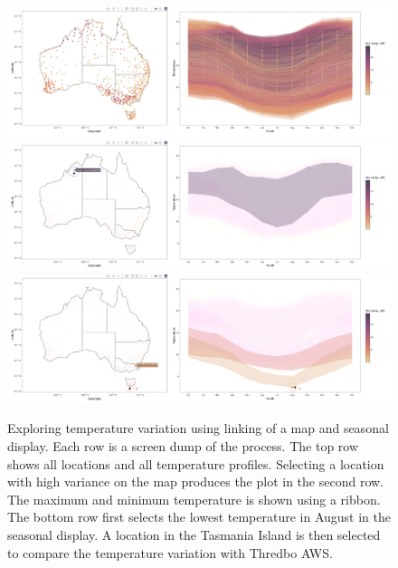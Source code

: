 \documentclass[
]{jss}
\begin{document}
\begin{CodeChunk}
\begin{figure}

{\centering \includegraphics[width=1\linewidth,height=0.23\textheight]{../figures/linking} \includegraphics[width=1\linewidth,height=0.23\textheight]{../figures/linking-north} \includegraphics[width=1\linewidth,height=0.23\textheight]{../figures/linking-lower} 

}

\caption[Exploring temperature variation using linking of a map and seasonal display]{Exploring temperature variation using linking of a map and seasonal display. Each row is a screen dump of the process. The top row shows all locations and all temperature profiles. Selecting a location with high variance on the map produces the plot in the second row. The maximum and minimum temperature is shown using a ribbon. The bottom row first selects the lowest temperature in August in the seasonal display. A location in the Tasmania Island is then selected to compare the temperature variation with Thredbo AWS.}\label{fig:interactive-linking}
\end{figure}
\end{CodeChunk}
\end{document}
